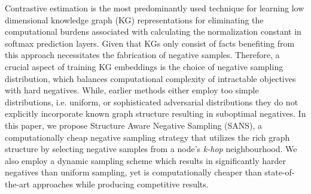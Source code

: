 Contrastive estimation is the most predominantly used technique for learning low dimensional knowledge graph (KG) representations for eliminating the computational burdens associated with calculating the normalization constant in softmax prediction layers. Given that KGs only consist of facts benefiting from this approach necessitates the fabrication of negative samples. Therefore, a crucial aspect of training KG embeddings is the choice of negative sampling distribution, which balances computational complexity of intractable objectives with hard negatives. While, earlier methods either employ too simple distributions, i.e. uniform, or sophisticated adversarial distributions they do not explicitly incorporate known graph structure resulting in suboptimal negatives. In this paper, we propose Structure Aware Negative Sampling (SANS), a computationally cheap negative sampling strategy that utilizes the rich graph structure by selecting negative samples from a node's \emph{k-hop} neighbourhood. We also employ a dynamic sampling scheme which results in significantly harder negatives than uniform sampling, yet is computationally cheaper than state-of-the-art approaches while producing competitive results. 






